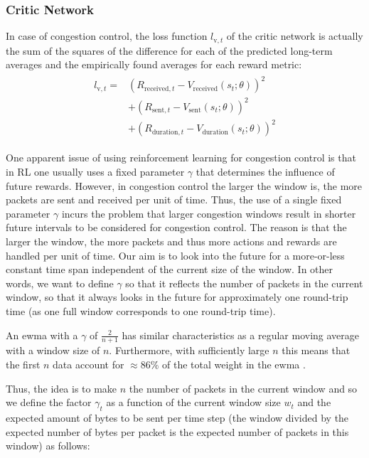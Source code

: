 \documentclass[10pt,sigconf,anonymous]{acmart}
\begin{document}
\subsubsection{Critic Network}
\label{subsubsec:critic}

In case of congestion control, the loss function $l_{\text{v},t}$ of the critic network is actually the sum of the squares of the difference for each of the predicted long-term averages and the empirically found averages for each reward metric:
\begin{align}
\begin{split}
l_{\text{v},t} =& \left(R_{\text{received},t} - V_\text{received}(s_t; \theta)\right)^2 \\
&+\left(R_{\text{sent},t} - V_\text{sent}(s_t; \theta)\right)^2 \\
&+\left(R_{\text{duration},t} - V_\text{duration}(s_t; \theta)\right)^2
\end{split}
\end{align}

One apparent issue of using reinforcement learning for congestion control is that in RL one usually uses a fixed parameter $\gamma$ that determines the influence of future rewards. However, in congestion control the larger the window is, the more packets are sent and received per unit of time. Thus, the use of a single fixed parameter $\gamma$ incurs the problem that larger congestion windows result in shorter future intervals to be considered for congestion control. The reason is that the larger the window, the more packets and thus more actions and rewards are handled per unit of time. Our aim is to look into the future for a more-or-less constant time span independent of the current size of the window. In other words, we want to define $\gamma$ so that it reflects the number of packets in the current window, so that it always looks in the future for approximately one round-trip time (as one full window corresponds to one round-trip time). 

An ewma with a $\gamma$ of $\frac{2}{n+1}$ has similar characteristics as a regular moving average with a window size of $n$. Furthermore, with sufficiently large $n$ this means that the first $n$ data account for $\approx 86\%$ of the total weight in the ewma \cite{nahmias_production_2009}.

Thus, the idea is to make $n$ the number of packets in the current window and so we define the factor $\gamma_t$ as a function of the current window size $w_t$ and the expected amount of bytes to be sent per time step (the window divided by the expected number of bytes per packet is the expected number of packets in this window) as follows:
\end{document}
